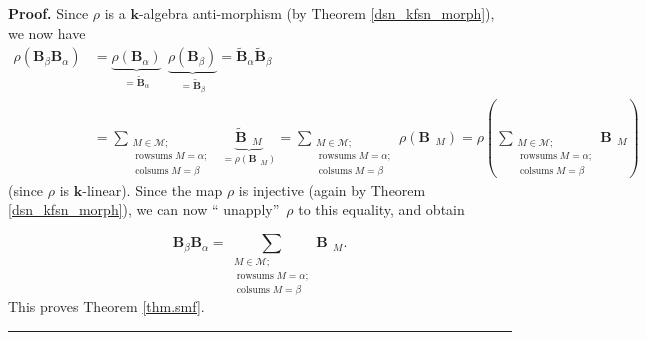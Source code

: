 \documentclass[12pt]{article}
\theoremstyle{definition}%
\theoremstyle{definition}%
\theoremstyle{remark}%
\newcommand{\kk}{\mathbf{k}}
\newcommand{\BB}{\mathbf{B}}
\newcommand{\BBt}{\widetilde{\mathbf{B}}}
\newcommand{\CM}{\mathcal{M}}
\newcommand{\rowsums}{\operatorname{rowsums}}
\newcommand{\colsums}{\operatorname{colsums}}
\newcommand{\readb}{\mathop{\overline{\operatorname{read}}}}
\newenvironment{proof}[1][Proof]{\noindent\textbf{#1.} }{\ \rule{0.5em}{0.5em}}
\begin{document}
\begin{proof}
Since $\rho$ is a $\kk$-algebra anti-morphism (by Theorem
\ref{dsn_kfsn_morph}), we now have
\begin{align*}
\rho\left(  \BB_{\beta}\BB_{\alpha}\right)   &
=\underbrace{\rho\left(  \BB_{\alpha}\right)  }_{=
\BBt_{\alpha}}\ \ \underbrace{\rho\left(  \BB_{\beta}\right)
}_{=\BBt_{\beta}}=\BBt_{\alpha
}\BBt_{\beta}\\
&  =\sum_{\substack{M\in\CM ;\\\rowsums M=\alpha
;\\\colsums M=\beta}}
\ \ \underbrace{\BBt_{\readb M}}_{=\rho\left(  \BB_{\readb M}\right)  }
=\sum_{\substack{M\in\CM ;\\\rowsums M=\alpha;\\
\colsums M=\beta}}\rho\left(  \BB_{\readb M}\right)
=\rho\left(  \sum_{\substack{M\in\CM ;\\\rowsums M
=\alpha;\\\colsums M=\beta}}\BB_{\readb M}\right)
\end{align*}
(since $\rho$ is $\kk$-linear). Since the map $\rho$ is injective
(again by Theorem \ref{dsn_kfsn_morph}), we can now \textquotedblleft
unapply\textquotedblright\ $\rho$ to this equality, and obtain

\[
\BB_{\beta}\BB_{\alpha} = \sum_{\substack{M\in\CM;\\
\rowsums M=\alpha;\\\colsums M=\beta}} \BB_{\readb M}.
\]
This proves Theorem \ref{thm.smf}.
\end{proof}




\end{document}
